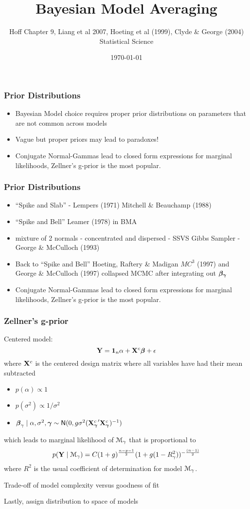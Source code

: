 \documentclass[]{beamer}
\title{Bayesian Model Averaging}
\author{Hoff Chapter 9, Liang et al 2007, Hoeting et al (1999), Clyde \&
 George (2004) Statistical Science}
\date{\today}
\begin{document}

\maketitle


\begin{frame}\frametitle{Prior Distributions}
  \begin{itemize}
  \item Bayesian Model choice requires  proper prior distributions on
    parameters that are not common across models  \pause
  \item Vague but proper priors may lead to paradoxes! \pause
  \item Conjugate Normal-Gammas lead to closed form expressions for
  marginal likelihoods, Zellner's g-prior is the most popular. \pause
  \end{itemize}
\end{frame}


\begin{frame}\frametitle{Prior Distributions}
  \begin{itemize}
  \item ``Spike and Slab'' - Lempers (1971) Mitchell \& Beauchamp (1988) \pause
  \item ``Spike and Bell''  Leamer (1978)  in BMA \pause
  \item   mixture of 2 normals - concentrated and dispersed - SSVS Gibbs Sampler -  George \& McCulloch (1993) \pause
  \item Back to ``Spike and Bell'' Hoeting, Raftery \& Madigan $MC^3$
    (1997) and George \& McCulloch (1997) collapsed MCMC after
    integrating out $\boldsymbol{\beta_\gamma}$
  \item Conjugate Normal-Gammas lead to closed form expressions for
  marginal likelihoods, Zellner's g-prior is the most popular. \pause
  \end{itemize}
\end{frame}

\begin{frame}\frametitle{Zellner's g-prior}
  Centered model:  $$\mathbf{Y} = \mathbf{1}_n \alpha + \mathbf{X}^c \boldsymbol{\beta} + \epsilon$$
  where $\mathbf{X}^c$ is the centered design matrix where all variables have
  had their mean subtracted \pause
\begin{itemize}
\item   $p(\alpha) \propto 1$ \pause
\item  $p(\sigma^2) \propto 1/\sigma^2$  \pause
\item  $\boldsymbol{\beta}_\gamma \mid \alpha, \sigma^2, \boldsymbol{\gamma} \sim \textsf{N}(0, g \sigma^2
  ({\mathbf{X}_{\boldsymbol{\gamma}}^c}^\prime \mathbf{X}_{\boldsymbol{\gamma}}^c)^{-1})$ \pause
\end{itemize}
which leads to marginal likelihood of ${\cal M}_\gamma$ that is proportional
to $$ p(\mathbf{Y} \mid {\cal M}_\gamma) = C (1 + g)^{\frac{n-p-1}{2}} ( 1 + g (1 -
 R^2_\gamma))^{- \frac{(n-1)}{2}}$$
where $R^2$ is the usual coefficient of determination for model ${\cal M}_\gamma$.
\pause

Trade-off of model complexity versus goodness of fit

\bigskip
Lastly, assign distribution to space of models
\end{frame}
\end{document}
